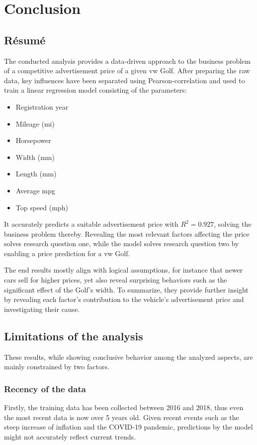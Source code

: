 \chapter{Conclusion}
\section{Résumé}

The conducted analysis provides a data-driven approach to the business problem of a competitive advertisement price of a given \ac{vw} Golf.
After preparing the raw data, key influences have been separated using Pearson-correlation and used to train a linear regression model consisting of the parameters:
\begin{itemize}
    \item Registration year
    \item Mileage (mi)
    \item Horsepower
    \item Width (mm)
    \item Length (mm)
    \item Average mpg
    \item Top speed (mph)
\end{itemize}
It accurately predicts a suitable advertisement price with $R^2 = 0.927$, solving the business problem thereby.
Revealing the most relevant factors affecting the price solves research question one, while the model solves research question two by enabling a price prediction for a \ac{vw} Golf.
\par
The end results mostly align with logical assumptions, for instance that newer cars sell for higher prices, yet also reveal
surprising behaviors such as the significant effect of the Golf's width.
To summarize, they provide further insight by revealing each factor's contribution to the vehicle's advertisement price and investigating their cause.
\section{Limitations of the analysis}
These results, while showing conclusive behavior among the analyzed aspects, are mainly constrained by two factors.
\subsection{Recency of the data}
Firstly, the training data has been collected between 2016 and 2018, thus even the most recent data
is now over 5 years old. Given recent events such as the steep increase of inflation
and the COVID-19 pandemic, predictions by the model might not accurately reflect current trends.

